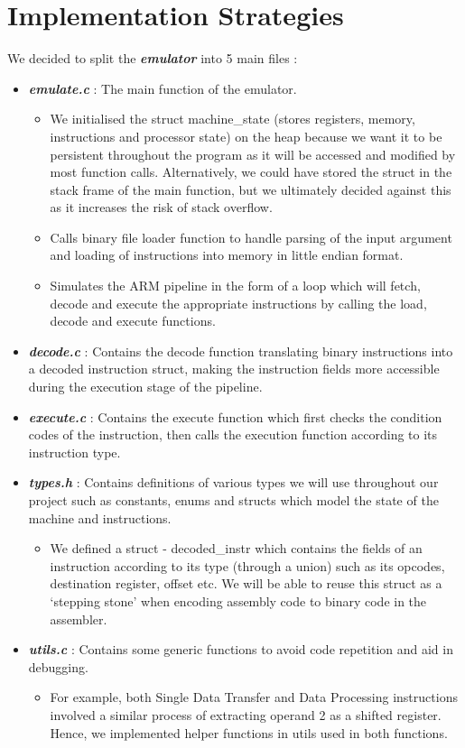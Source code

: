 \documentclass[11pt]{article}
\begin{document}
\section{Implementation Strategies}

We decided to split the \textbf{\emph{emulator}} into 5 main files :

\begin{itemize}
	\item \textbf{\emph{emulate.c}} : The main function of the emulator.
	\begin{itemize}
		\item We initialised the struct machine\_state (stores registers, memory, instructions and processor state) on the heap because we want it to be persistent throughout the program as it will be accessed 				  and modified by most function calls. Alternatively, we could have stored the struct in the stack frame of the main function, but we ultimately decided against this as it increases the risk of stack 			  overflow.
		\item Calls binary file loader function to handle parsing of the input argument and loading of instructions into memory in little endian format.
		\item Simulates the ARM pipeline in the form of a loop which will fetch, decode and execute the appropriate instructions by calling the load, decode and execute functions.
	\end{itemize}
	\item \textbf{\emph{decode.c}} : Contains the decode function translating binary instructions into a decoded instruction struct, making the instruction fields more accessible during the 									     execution stage of the pipeline.
	\item \textbf{\emph{execute.c}} : Contains the execute function which first checks the condition codes of the instruction, then calls the execution function according to its instruction type. 
	\item \textbf{\emph{types.h}} : Contains definitions of various types we will use throughout our project such as constants, enums and structs which model the state of the machine and instructions.
	\begin{itemize}
		\item We defined a struct - decoded\_instr which contains the fields of an instruction according to its type (through a union)  such as its opcodes, destination register, offset etc. We will be able 				  to reuse this struct as a ‘stepping stone’ when encoding assembly code to binary code in the assembler.
	\end{itemize}
	\item \textbf{\emph{utils.c}} : Contains some generic functions to avoid code repetition and aid in debugging.
	\begin{itemize}
	\item For example, both Single Data Transfer and Data Processing instructions involved a similar process of extracting operand 2 as a shifted register. Hence, we implemented helper functions in utils used in 		  both functions.
	\end{itemize}
\end{itemize}
\end{document}

